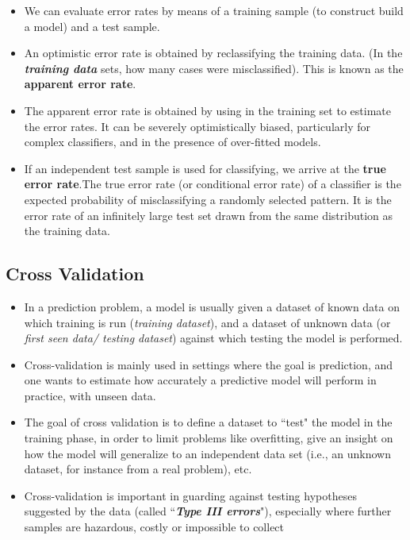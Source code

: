 \documentclass[a4paper,12pt]{article}
\begin{document}
\begin{itemize}
	\item We can evaluate error rates by means of a training sample (to construct build a model) and a test sample.
	
	
	\item 	An optimistic error rate is obtained by reclassifying the training data. (In the \textbf{\textit{training data}} sets, how many cases were misclassified). This is known as the \textbf{apparent error rate}.
	
	
	\item 	The apparent error rate is obtained by using in the training set to estimate
	the error rates. It can be severely optimistically biased, particularly for complex classifiers, and in the presence of over-fitted models.
	
	
	\item	If an independent test sample is used for classifying, we arrive at the  \textbf{true error rate}.The true error rate (or conditional error rate) of a classifier is the expected
	probability of misclassifying a randomly selected pattern.
	It is the error rate of an infinitely large test set drawn from the same distribution as the training data.
\end{itemize}








\subsection{Cross Validation}
\begin{itemize}
\item In a prediction problem, a model is usually given a dataset of known data 
on which training is run (\textit{training dataset}), and a dataset of unknown data (or \textit{first seen data/ testing dataset}) against which testing the model is performed.
\item Cross-validation is mainly used in settings where the goal is prediction, and one wants to estimate how accurately a predictive model will perform in practice, with unseen data.
\item The goal of cross validation is to define a dataset to ``test" the model in the training phase, in order to limit problems like overfitting, give an insight on how the model will generalize to an independent data set (i.e., an unknown dataset, for instance from a real problem), etc.
\item Cross-validation is important in guarding against testing hypotheses suggested by the data (called ``\textbf{\textit{Type III errors}}"), especially where further samples 
are hazardous, costly or impossible to collect 
\end{itemize}
\end{document}
